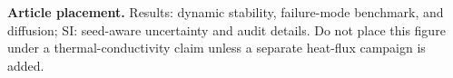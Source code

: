 \textbf{Article placement.} Results: dynamic stability, failure-mode benchmark, and diffusion; SI: seed-aware uncertainty and audit details. Do not place this figure under a thermal-conductivity claim unless a separate heat-flux campaign is added.
